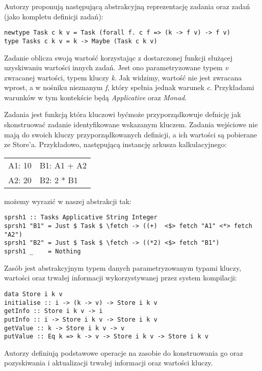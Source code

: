 \lstset{style=haskell-style}

Autorzy proponują następującą abstrakcyjną reprezentację zadania oraz zadań (jako kompletu definicji zadań):

\begin{lstlisting}
newtype Task c k v = Task (forall f. c f => (k -> f v) -> f v)
type Tasks c k v = k -> Maybe (Task c k v)
\end{lstlisting}

Zadanie oblicza swoją wartość korzystając z dostarczonej funkcji służącej uzyskiwaniu wartości innych zadań. Jest ono parametryzowane typem \textit{v} zwracanej wartości, typem kluczy \textit{k}. Jak widzimy, wartość nie jest zwracana wprost, a w nośniku nieznanym \textit{f}, który spełnia jednak warunek \textit{c}. Przykładami warunków w tym kontekście będą \textit{Applicative} oraz \textit{Monad}.

Zadania jest funkcją która kluczowi byćmoże przyporządkowuje defnicję jak skonstruować zadanie identyfikowane wskazanym kluczem. Zadania wejściowe nie mają do swoich kluczy przyporządkowanych definicji, a ich wartości są pobierane ze Store'a. Przykładowo, następującą instancję arkusza kalkulacyjnego:

\begin{tabular}{ l l }
  A1: 10 & B1: A1 + A2 \\
  A2: 20 & B2: 2 * B1
\end{tabular}

możemy wyrazić w naszej abstrakcji tak:

\begin{lstlisting}
sprsh1 :: Tasks Applicative String Integer
sprsh1 "B1" = Just $ Task $ \fetch -> ((+)  <$> fetch "A1" <*> fetch "A2")
sprsh1 "B2" = Just $ Task $ \fetch -> ((*2) <$> fetch "B1")
sprsh1 _    = Nothing
\end{lstlisting}

Zasób jest abstrakcyjnym typem danych parametryzowanym typami kluczy, wartości oraz trwałej informacji wykorzystywanej przez system kompilacji:

\begin{lstlisting}
data Store i k v
initialise :: i -> (k -> v) -> Store i k v
getInfo :: Store i k v -> i
putInfo :: i -> Store i k v -> Store i k v
getValue :: k -> Store i k v -> v
putValue :: Eq k => k -> v -> Store i k v -> Store i k v
\end{lstlisting}

Autorzy definiują podstawowe operacje na zasobie do konstruowania go oraz pozyskiwania i aktualizacji trwałej informacji oraz wartości kluczy.

